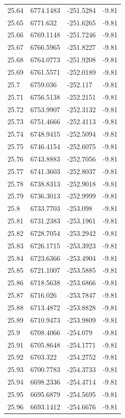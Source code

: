 \begin{table}[H]
\begin{tabular}{llll}
25.64 & 6774.1483 & -251.5284 & -9.81 \\
25.65 & 6771.632 & -251.6265 & -9.81 \\
25.66 & 6769.1148 & -251.7246 & -9.81 \\
25.67 & 6766.5965 & -251.8227 & -9.81 \\
25.68 & 6764.0773 & -251.9208 & -9.81 \\
25.69 & 6761.5571 & -252.0189 & -9.81 \\
25.7 & 6759.036 & -252.117 & -9.81 \\
25.71 & 6756.5138 & -252.2151 & -9.81 \\
25.72 & 6753.9907 & -252.3132 & -9.81 \\
25.73 & 6751.4666 & -252.4113 & -9.81 \\
25.74 & 6748.9415 & -252.5094 & -9.81 \\
25.75 & 6746.4154 & -252.6075 & -9.81 \\
25.76 & 6743.8883 & -252.7056 & -9.81 \\
25.77 & 6741.3603 & -252.8037 & -9.81 \\
25.78 & 6738.8313 & -252.9018 & -9.81 \\
25.79 & 6736.3013 & -252.9999 & -9.81 \\
25.8 & 6733.7703 & -253.098 & -9.81 \\
25.81 & 6731.2383 & -253.1961 & -9.81 \\
25.82 & 6728.7054 & -253.2942 & -9.81 \\
25.83 & 6726.1715 & -253.3923 & -9.81 \\
25.84 & 6723.6366 & -253.4904 & -9.81 \\
25.85 & 6721.1007 & -253.5885 & -9.81 \\
25.86 & 6718.5638 & -253.6866 & -9.81 \\
25.87 & 6716.026 & -253.7847 & -9.81 \\
25.88 & 6713.4872 & -253.8828 & -9.81 \\
25.89 & 6710.9473 & -253.9809 & -9.81 \\
25.9 & 6708.4066 & -254.079 & -9.81 \\
25.91 & 6705.8648 & -254.1771 & -9.81 \\
25.92 & 6703.322 & -254.2752 & -9.81 \\
25.93 & 6700.7783 & -254.3733 & -9.81 \\
25.94 & 6698.2336 & -254.4714 & -9.81 \\
25.95 & 6695.6879 & -254.5695 & -9.81 \\
25.96 & 6693.1412 & -254.6676 & -9.81 \\

\end{tabular}
\end{table}
